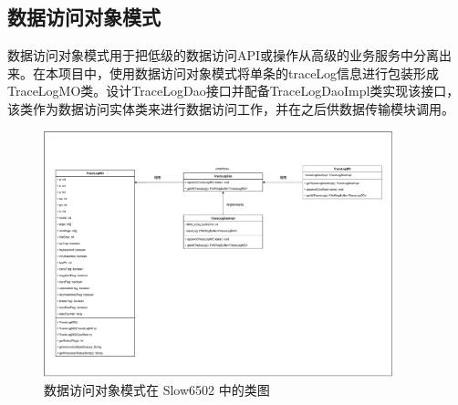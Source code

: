 \subsection{数据访问对象模式}

数据访问对象模式用于把低级的数据访问API或操作从高级的业务服务中分离出来。在本项目中，使用数据访问对象模式将单条的traceLog信息进行包装形成TraceLogMO类。设计TraceLogDao接口并配备TraceLogDaoImpl类实现该接口，该类作为数据访问实体类来进行数据访问工作，并在之后供数据传输模块调用。

\begin{figure}[htb]
  \centering
  \includegraphics[width=0.9\textwidth]{figures/数据访问对象模式.pdf}
  \caption{数据访问对象模式在 Slow6502 中的类图}
\end{figure}
